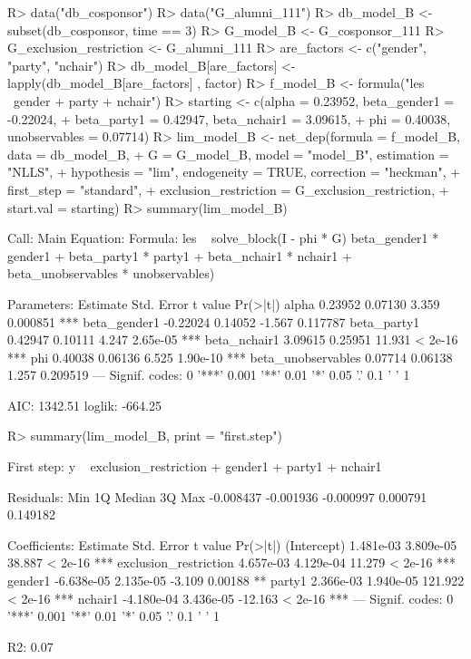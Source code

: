 \documentclass[nojss]{jss}
\begin{document}
\begin{CodeChunk}
\begin{CodeInput}
R> data("db_cosponsor")
R> data("G_alumni_111")
R> db_model_B <- subset(db_cosponsor, time == 3)
R> G_model_B <- G_cosponsor_111
R> G_exclusion_restriction <- G_alumni_111
R> are_factors <- c("gender", "party", "nchair")
R> db_model_B[are_factors] <- lapply(db_model_B[are_factors] , factor)
R> f_model_B <- formula("les ~gender + party + nchair")
R> starting <- c(alpha = 0.23952, beta_gender1 = -0.22024,
+    beta_party1 = 0.42947, beta_nchair1 = 3.09615,
+    phi = 0.40038, unobservables = 0.07714)
R> lim_model_B <- net_dep(formula = f_model_B, data = db_model_B,
+    G = G_model_B, model = "model_B", estimation = "NLLS",
+    hypothesis = "lim", endogeneity = TRUE, correction = "heckman",
+    first_step = "standard", 
+    exclusion_restriction = G_exclusion_restriction, 
+    start.val = starting)
R> summary(lim_model_B)
\end{CodeInput}
\begin{CodeOutput}
Call:
Main Equation:  
Formula: les ~ solve_block(I - phi * G) %
beta_gender1 * gender1 + beta_party1 * party1 + 
beta_nchair1 * nchair1 + beta_unobservables * unobservables)

Parameters:
Estimate Std. Error t value Pr(>|t|)    
alpha               0.23952    0.07130   3.359 0.000851 ***
beta_gender1       -0.22024    0.14052  -1.567 0.117787    
beta_party1         0.42947    0.10111   4.247 2.65e-05 ***
beta_nchair1        3.09615    0.25951  11.931  < 2e-16 ***
phi                 0.40038    0.06136   6.525 1.90e-10 ***
beta_unobservables  0.07714    0.06138   1.257 0.209519    
---
Signif. codes:  0 '***' 0.001 '**' 0.01 '*' 0.05 '.' 0.1 ' ' 1

AIC: 1342.51  loglik: -664.25
\end{CodeOutput}
\begin{CodeInput}
R> summary(lim_model_B, print = "first.step")
\end{CodeInput}
\begin{CodeOutput}
First step:  y ~ exclusion_restriction + gender1 + party1 + nchair1

Residuals:
Min        1Q    Median        3Q       Max 
-0.008437 -0.001936 -0.000997  0.000791  0.149182 

Coefficients:
Estimate Std. Error t value Pr(>|t|)    
(Intercept)            1.481e-03  3.809e-05  38.887  < 2e-16 ***
exclusion_restriction  4.657e-03  4.129e-04  11.279  < 2e-16 ***
gender1               -6.638e-05  2.135e-05  -3.109  0.00188 ** 
party1                 2.366e-03  1.940e-05 121.922  < 2e-16 ***
nchair1               -4.180e-04  3.436e-05 -12.163  < 2e-16 ***
---
Signif. codes:  0 '***' 0.001 '**' 0.01 '*' 0.05 '.' 0.1 ' ' 1

R2: 0.07
\end{CodeOutput}
\end{CodeChunk}
\end{document}

